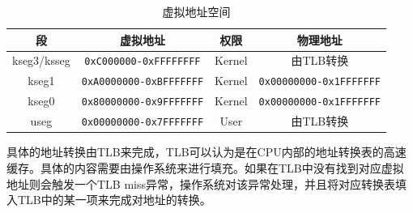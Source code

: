 \begin{table}[htbp]
	\centering
	\begin{tabular}{|c|c|c|c|} \hline
		\textbf{段} & \textbf{虚拟地址} & \textbf{权限} & \textbf{物理地址} \\ \hline
		kseg3/ksseg & \texttt{0xC000000-0xFFFFFFFF} & Kernel & 由TLB转换 \\ \hline
		kseg1 & \texttt{0xA0000000-0xBFFFFFFF} & Kernel & \texttt{0x00000000-0x1FFFFFFF} \\ \hline
		kseg0 & \texttt{0x80000000-0x9FFFFFFF} & Kernel & \texttt{0x00000000-0x1FFFFFFF} \\ \hline
		useg &  \texttt{0x00000000-0x7FFFFFFF} & User & 由TLB转换 \\ \hline
	\end{tabular}
	\caption{虚拟地址空间}
	\label{tab:virtual-address-space}
\end{table}

具体的地址转换由TLB来完成，TLB可以认为是在CPU内部的地址转换表的高速缓存。具体的内容需要由操作系统来进行填充。如果在TLB中没有找到对应虚拟地址则会触发一个TLB miss异常，操作系统对该异常处理，并且将对应转换表填入TLB中的某一项来完成对地址的转换。
